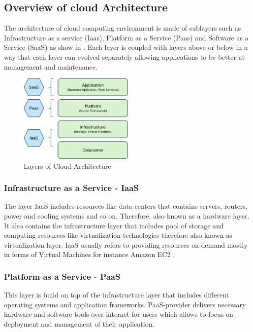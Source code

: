 \subsection{Overview of cloud Architecture}

The architecture of cloud computing environment is made of sublayers such as Infrastructure as a service (Iaas),  Platform as a Service (Paas) and Software as a Service (SaaS) as show in . Each layer is coupled with layers above or below in a way that each layer can evolved separately allowing applications to be better at management and maintenance. 

\begin{figure}[ht]
    \centering
    \includegraphics[width=0.5\textwidth]{chapters/images/Cloud_Computing/Cloud_layers.png}
    \caption{Layers of Cloud Architecture}
    \label{fig:Layers_of_Cloud_Architecture}
\end{figure}

\subsubsection{Infrastructure as a Service - IaaS}
The layer IaaS includes resources like data centers that contains servers, routers, power and cooling systems and so on. Therefore, also known as a hardware layer. It also contains the infrastructure layer that includes pool of storage and computing resources like virtualization technologies therefore also known as virtualization layer. IaaS usually refers to providing resources on-demand mostly in forms of Virtual Machines for instance Amazon EC2 \cite{AWS_ec2}. 

\subsubsection{Platform as a Service - PaaS}

This layer is build on top of the infrastructure layer that includes different operating systems and application frameworks. PaaS-provider delivers necessary hardware and software tools over internet for users which allows to focus on deployment and management of their application. 

